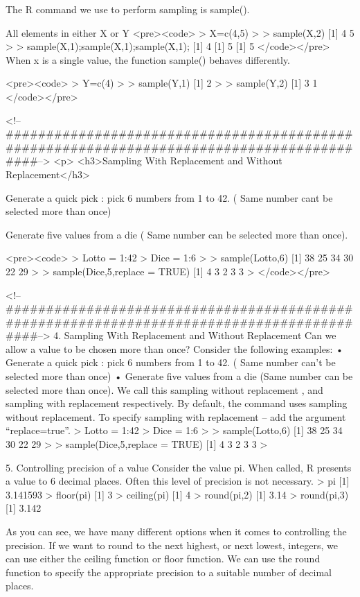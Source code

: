 The R command we use to perform sampling is sample().

All elements in either X or Y
<pre><code>
> X=c(4,5)
>
> sample(X,2)
[1] 4 5
>
> sample(X,1);sample(X,1);sample(X,1);
[1] 4
[1] 5
[1] 5
</code></pre>
When x is a single value, the function sample() behaves differently.

<pre><code>
> Y=c(4)
>
> sample(Y,1)
[1] 2
> 
> sample(Y,2)
[1] 3 1
</code></pre>

<!--##########################################################################################-->
<p>
<h3>Sampling With Replacement and Without Replacement</h3>

Generate a quick pick : pick 6 numbers from 1 to 42. ( Same number cant be selected more than once)

Generate five values from a die ( Same number can be selected more than once).

<pre><code>
> Lotto = 1:42
> Dice = 1:6
> 
> sample(Lotto,6)
[1] 38 25 34 30 22 29
> 
> sample(Dice,5,replace = TRUE)
[1] 4 3 2 3 3
>
</code></pre>

<!--##########################################################################################-->
4. Sampling With Replacement and Without Replacement
Can we allow a value to be chosen more than once? Consider the following examples:
•	Generate a quick pick : pick 6 numbers from 1 to 42. ( Same number can’t be selected more than once)
•	Generate five values from a die (Same number can be selected more than once).
We call this sampling without replacement , and sampling with replacement respectively.
By default, the command uses sampling without replacement. To specify sampling with replacement – add the argument “replace=true”.
> Lotto = 1:42
> Dice = 1:6
> 
> sample(Lotto,6)
[1] 38 25 34 30 22 29
> 
> sample(Dice,5,replace = TRUE)
[1] 4 3 2 3 3
>



5. Controlling precision of a value
Consider the value pi.  When called, R presents a value to 6 decimal places.
Often this level of precision is not necessary.
> pi
[1] 3.141593
> floor(pi)
[1] 3
> ceiling(pi)
[1] 4
> round(pi,2)
[1] 3.14
> round(pi,3)
[1] 3.142

As you can see, we have many different options when it comes to controlling the precision. If we want to round to the next highest, or next lowest, integers, we can use either the ceiling function or floor function.
We can use the round function to specify the appropriate precision to a suitable number of decimal places.




